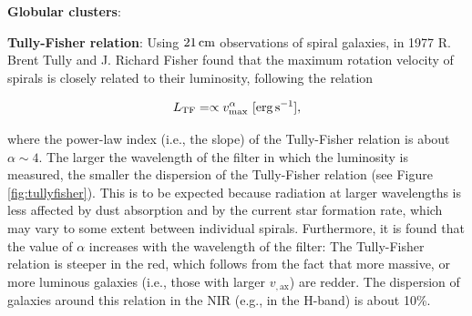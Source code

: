 \documentclass[a4paper,11pt]{article}
\begin{document}
{\noindent}\textbf{Globular clusters}: 

{\noindent}\textbf{Tully-Fisher relation}: Using $21\,{\rm cm}$ observations of spiral galaxies, in 1977 R. Brent Tully and J. Richard Fisher found that the maximum rotation velocity of spirals is closely related to their luminosity, following the relation

\begin{align*}
    L_\mathrm{TF} = \propto v_\mathrm{max}^\alpha ~ [{\rm erg\,s^{-1}}],
\end{align*}

{\noindent}where the power-law index (i.e., the slope) of the Tully-Fisher relation is about $\alpha\sim4$. The larger the wavelength of the filter in which the luminosity is measured, the smaller the dispersion of the Tully-Fisher relation (see Figure \ref{fig:tullyfisher}). This is to be expected because radiation at larger wavelengths is less affected by dust absorption and by the current star formation rate, which may vary to some extent between individual spirals. Furthermore, it is found that the value of $\alpha$ increases with the wavelength of the filter: The Tully-Fisher relation is steeper in the red, which follows from the fact that more massive, or more luminous galaxies (i.e., those with larger $v_\mathrm{,ax}$) are redder. The dispersion of galaxies around this relation in the NIR (e.g., in the H-band) is about 10\%.
\end{document}
